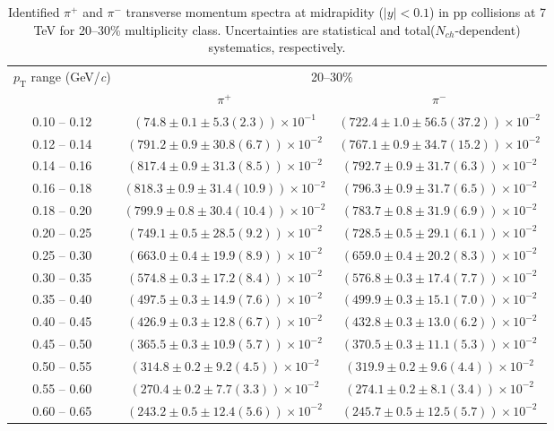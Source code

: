 \begin{table}
\caption{Identified $\pi^{+}$ and $\pi^{-}$  transverse momentum spectra at midrapidity ($|y|<0.1$) in pp collisions at 7 TeV for 20--30\% multiplicity class. Uncertainties are statistical and total($N_{ch}$-dependent) systematics, respectively.}
\label{tab:PionPlus_PionMinus_20to30}
\begin{center}
\begin{tabular}{ c | c c }
\hline
\multirow{2}{*}{$p_{\mathrm{T}}$ range (GeV/\textit{c})} & \multicolumn{2}{c}{20--30\%} \\ & $\pi^{+}$& $\pi^{-}$\\ 
\hline
0.10 -- 0.12 & $(74.8\pm0.1\pm5.3(2.3))\times10^{-1}$ & $(722.4\pm1.0\pm56.5(37.2))\times10^{-2}$ \\ 
0.12 -- 0.14 & $(791.2\pm0.9\pm30.8(6.7))\times10^{-2}$ & $(767.1\pm0.9\pm34.7(15.2))\times10^{-2}$ \\ 
0.14 -- 0.16 & $(817.4\pm0.9\pm31.3(8.5))\times10^{-2}$ & $(792.7\pm0.9\pm31.7(6.3))\times10^{-2}$ \\ 
0.16 -- 0.18 & $(818.3\pm0.9\pm31.4(10.9))\times10^{-2}$ & $(796.3\pm0.9\pm31.7(6.5))\times10^{-2}$ \\ 
0.18 -- 0.20 & $(799.9\pm0.8\pm30.4(10.4))\times10^{-2}$ & $(783.7\pm0.8\pm31.9(6.9))\times10^{-2}$ \\ 
0.20 -- 0.25 & $(749.1\pm0.5\pm28.5(9.2))\times10^{-2}$ & $(728.5\pm0.5\pm29.1(6.1))\times10^{-2}$ \\ 
0.25 -- 0.30 & $(663.0\pm0.4\pm19.9(8.9))\times10^{-2}$ & $(659.0\pm0.4\pm20.2(8.3))\times10^{-2}$ \\ 
0.30 -- 0.35 & $(574.8\pm0.3\pm17.2(8.4))\times10^{-2}$ & $(576.8\pm0.3\pm17.4(7.7))\times10^{-2}$ \\ 
0.35 -- 0.40 & $(497.5\pm0.3\pm14.9(7.6))\times10^{-2}$ & $(499.9\pm0.3\pm15.1(7.0))\times10^{-2}$ \\ 
0.40 -- 0.45 & $(426.9\pm0.3\pm12.8(6.7))\times10^{-2}$ & $(432.8\pm0.3\pm13.0(6.2))\times10^{-2}$ \\ 
0.45 -- 0.50 & $(365.5\pm0.3\pm10.9(5.7))\times10^{-2}$ & $(370.5\pm0.3\pm11.1(5.3))\times10^{-2}$ \\ 
0.50 -- 0.55 & $(314.8\pm0.2\pm9.2(4.5))\times10^{-2}$ & $(319.9\pm0.2\pm9.6(4.4))\times10^{-2}$ \\ 
0.55 -- 0.60 & $(270.4\pm0.2\pm7.7(3.3))\times10^{-2}$ & $(274.1\pm0.2\pm8.1(3.4))\times10^{-2}$ \\ 
0.60 -- 0.65 & $(243.2\pm0.5\pm12.4(5.6))\times10^{-2}$ & $(245.7\pm0.5\pm12.5(5.7))\times10^{-2}$ \\ 

\end{tabular}
\end{center}
\end{table}
